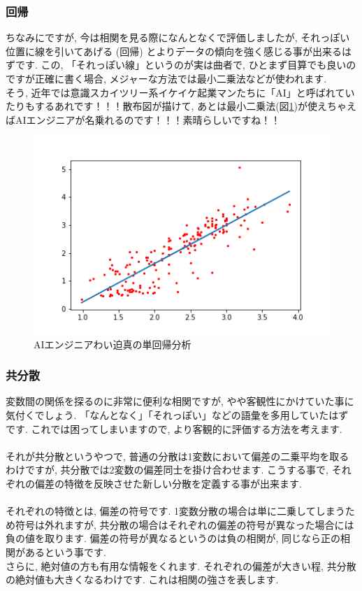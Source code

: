\documentclass[11pt,a4paper]{jreport}
\begin{document}
\subsubsection{回帰}
ちなみにですが, 今は相関を見る際になんとなくで評価しましたが, それっぽい位置に線を引いてあげる (回帰) とよりデータの傾向を強く感じる事が出来るはずです. この, 「それっぽい線」というのが実は曲者で, ひとまず目算でも良いのですが正確に書く場合, メジャーな方法では最小二乗法などが使われます. \\
そう, 近年では意識スカイツリー系イケイケ起業マンたちに「AI」と呼ばれていたりもするあれです！！！散布図が描けて, あとは最小二乗法(図\ref{im:predict})が使えちゃえばAIエンジニアが名乗れるのです！！！素晴らしいですね！！\\

\begin{figure}[H]
\label{im:predict}
  \centering
  \includegraphics[width=120mm,bb=0 0 432 288]{figures/predict.png}
  \caption{AIエンジニアわい迫真の単回帰分析}
\end{figure}

\subsubsection{共分散}
変数間の関係を探るのに非常に便利な相関ですが, やや客観性にかけていた事に気付くでしょう. 「なんとなく」「それっぽい」などの語彙を多用していたはずです. これでは困ってしまいますので, より客観的に評価する方法を考えます.\\
\\
それが共分散というやつで, 普通の分散は1変数において偏差の二乗平均を取るわけですが, 共分散では2変数の偏差同士を掛け合わせます. こうする事で, それぞれの偏差の特徴を反映させた新しい分散を定義する事が出来ます. \\
\\
それぞれの特徴とは, 偏差の符号です. 1変数分散の場合は単に二乗してしまうため符号は外れますが, 共分散の場合はそれぞれの偏差の符号が異なった場合には負の値を取ります. 偏差の符号が異なるというのは負の相関が, 同じなら正の相関があるという事です.\\
さらに, 絶対値の方も有用な情報をくれます. それぞれの偏差が大きい程, 共分散の絶対値も大きくなるわけです. これは相関の強さを表します.\\
\end{document}
